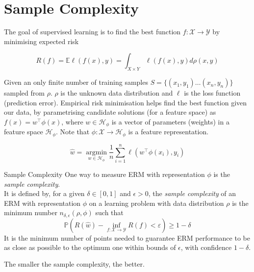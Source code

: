 \section{Sample Complexity}
The goal of supervised learning is to find the best function $f: \mathcal{X} \rightarrow \mathcal{Y}$ by minimising expected risk

\begin{equation}
    R(f)=\mathbb{E}\left.\ell(f(x),y)=\int_{X\times Y}\ell(f(x),y)\right.d\rho(x,y)
\end{equation}

Given an only finite number of training samples $S=\{(x_1,y_1)\ldots(x_n,y_n)\}$ sampled from $\rho.$
$\rho$ is the unknown data distribution and $\ell$ is the loss function (prediction error). Empirical risk minimisation helps find the best function given our data, by parametrising candidate solutions (for a feature space) as $f(x) = w^\top \phi (x)$, where $w \in \mathcal{H}_\phi$ is a vector of parameters (weights) in a feature space $\mathcal{H}_\phi$. Note that $\phi : \mathcal{X} \rightarrow \mathcal{H}_\phi$ is a feature representation.

\begin{equation}
    \hat{w}=\operatorname*{argmin}_{w\in\mathcal{H}_\phi}\frac1n\sum_{i=1}^n\ell(w^\top\phi(x_i),y_i)
\end{equation}

\begin{definitionbox}{Sample Complexity}
    One way to measure ERM with representation $\phi$ is the \textit{sample complexity}. \\

    It is defined by, for a given $\delta \in [0,1]$ and $\epsilon > 0$, the \textit{sample complexity} of an ERM with representation $\phi$ on a learning problem with data distribution $\rho$ is the minimum number $n_{\delta, \epsilon}(\rho, \phi)$ such that 
    \begin{equation}
        \mathbb{P}\left(R(\hat{w})-\inf_{f:\mathcal{X}\to\mathcal{Y}}R(f)<\varepsilon\right)\geqslant1-\delta 
    \end{equation}
    It is the minimum number of points needed to guarantee ERM performance to be as close as possible to the optimum one within bounds of $\epsilon$, with confidence $1-\delta$.

    The smaller the sample complexity, the better.
\end{definitionbox}

